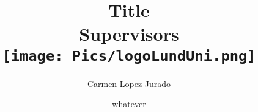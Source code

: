 \documentclass{article}
\begin{document}
\title{
    {\Huge \textbf{Title}}\\[0.7\baselineskip]
    {\Huge Supervisors}\\[3.0\baselineskip]
    \texttt{[image: Pics/logoLundUni.png]}\\[3.0\baselineskip]
}
\author{Carmen Lopez Jurado}
\date{whatever}

\maketitle


\newpage
\tableofcontents %
\listoffigures
\listoftables










\end{document}
